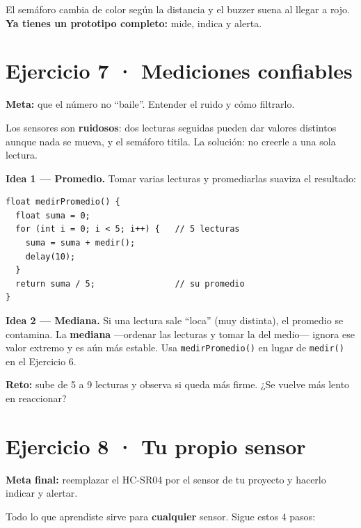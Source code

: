 \documentclass[10pt,letterpaper]{article}
\begin{document}
\begin{veras}El semáforo cambia de color según la distancia y el buzzer suena al llegar a rojo.
\textbf{Ya tienes un prototipo completo:} mide, indica y alerta.\end{veras}

\section{Ejercicio 7 · Mediciones confiables}
\begin{objetivo}\textbf{Meta:} que el número no ``baile''. Entender el ruido y cómo filtrarlo.\end{objetivo}

Los sensores son \textbf{ruidosos}: dos lecturas seguidas pueden dar valores distintos aunque nada
se mueva, y el semáforo titila. La solución: no creerle a una sola lectura.

\textbf{Idea 1 — Promedio.} Tomar varias lecturas y promediarlas suaviza el resultado:
\begin{lstlisting}[style=arduino]
float medirPromedio() {
  float suma = 0;
  for (int i = 0; i < 5; i++) {   // 5 lecturas
    suma = suma + medir();
    delay(10);
  }
  return suma / 5;                // su promedio
}
\end{lstlisting}

\textbf{Idea 2 — Mediana.} Si una lectura sale ``loca'' (muy distinta), el promedio se contamina.
La \textbf{mediana} —ordenar las lecturas y tomar la del medio— ignora ese valor extremo y es aún
más estable. Usa \texttt{medirPromedio()} en lugar de \texttt{medir()} en el Ejercicio 6.

\begin{reto}\textbf{Reto:} sube de 5 a 9 lecturas y observa si queda más firme. ¿Se vuelve más
lento en reaccionar?\end{reto}

\section{Ejercicio 8 · Tu propio sensor}
\begin{objetivo}\textbf{Meta final:} reemplazar el HC-SR04 por el sensor de tu proyecto y hacerlo
indicar y alertar.\end{objetivo}

Todo lo que aprendiste sirve para \textbf{cualquier} sensor. Sigue estos 4 pasos:
\end{document}
